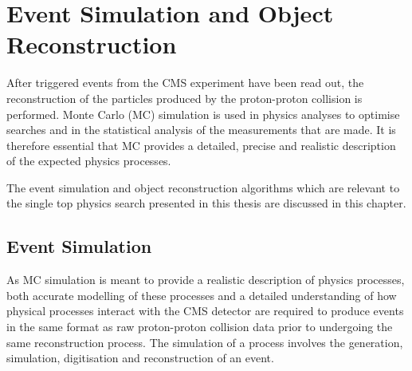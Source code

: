 \chapter{Event Simulation and Object Reconstruction}\label{chapter:data-mc}
After triggered events from the CMS experiment have been read out, the reconstruction of the particles produced by the proton-proton collision is performed.
Monte Carlo (MC) simulation is used in physics analyses to optimise searches and in the statistical analysis of the measurements that are made.
It is therefore essential that MC provides a detailed, precise and realistic description of the expected physics processes.
 
The event simulation and object reconstruction algorithms which are relevant to the single top physics search presented in this thesis are discussed in this chapter.

\section{Event Simulation}\label{sec:sim}
As MC simulation is meant to provide a realistic description of physics processes, both accurate modelling of these processes and a detailed understanding of how physical processes interact with the CMS detector are required to produce events in the same format as raw proton-proton collision data prior to undergoing the same reconstruction process.
The simulation of a process involves the generation, simulation, digitisation and reconstruction of an event.

%
%


%


